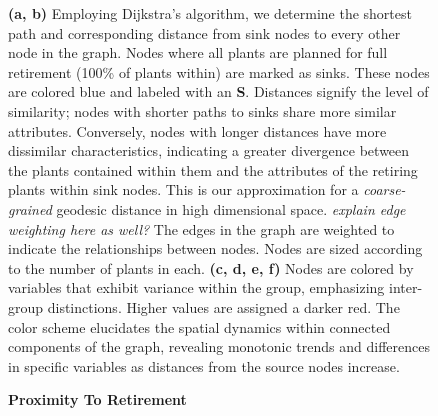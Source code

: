 \begin{figure}[H]
    \caption{\textbf{Proximity To Retirement}}
    \medskip
    \footnotesize
    \textbf{(a, b)} Employing Dijkstra's algorithm, we determine the shortest path and corresponding distance from sink nodes to every other node in the graph. Nodes where all plants are planned for full retirement (100\% of plants within) are marked as sinks. These nodes are colored blue and labeled with an \textbf{S}. Distances signify the level of similarity; nodes with shorter paths to sinks share more similar attributes. Conversely, nodes with longer distances have more dissimilar characteristics, indicating a greater divergence between the plants contained within them and the attributes of the retiring plants within sink nodes.  This is our approximation for a \textit{coarse-grained} geodesic distance in high dimensional space. \textit{explain edge weighting here as well?}
    The edges in the graph are weighted to indicate the relationships between nodes. Nodes are sized according to the number of plants in each. 
    \textbf{(c, d, e, f)} Nodes are colored by variables that exhibit variance within the group, emphasizing inter-group distinctions. Higher values are assigned a darker red. The color scheme elucidates the spatial dynamics within connected components of the graph, revealing monotonic trends and differences in specific variables as distances from the source nodes increase.
    \label{fig:shortest-path-graphs}
\end{figure}



